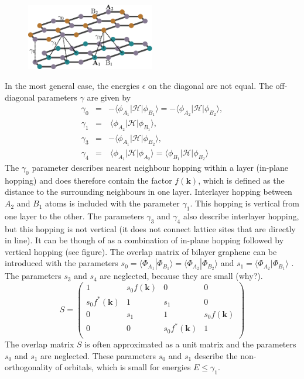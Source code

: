 \begin{figure}
\centering
\includegraphics[width=0.5\textwidth]{figure/numericalframework/graphene_lattice_bi_layer_planes_csch}
\end{figure}
In the most general case, the energies $\epsilon$ on the diagonal are not equal. The off-diagonal parameters $\gamma$ are given by
\begin{eqnarray}
\gamma_0 &=& - \langle \phi_{A_1} | \mathcal{H} | \phi_{B_1} \rangle = - \langle \phi_{A_2} | \mathcal{H} | \phi_{B_2} \rangle, \\
\gamma_1 &=& ~\langle \phi_{A_2} | \mathcal{H} | \phi_{B_1} \rangle, \\
\gamma_3 &=& - \langle \phi_{A_1} | \mathcal{H} | \phi_{B_2} \rangle, \\
\gamma_4 &=& ~\langle \phi_{A_1} | \mathcal{H} | \phi_{A_2} \rangle = \langle \phi_{B_1} | \mathcal{H} | \phi_{B_2} \rangle
\end{eqnarray}
The $\gamma_0$ parameter describes nearest neighbour hopping within a layer (in-plane hopping) and does therefore contain the factor $f\left( \mathbf{k} \right)$, which is defined as the distance to the surrounding neighbours in one layer. %
Interlayer hopping between $A_2$ and $B_1$ atoms is included with the parameter $\gamma_1$. This hopping is vertical from one layer to the other. The parameters $\gamma_3$ and $\gamma_4$ also describe interlayer hopping, but this hopping is not vertical (it does not connect lattice sites that are directly in line). It can be though of as a combination of in-plane hopping followed by vertical hopping (see figure).
The overlap matrix of bilayer graphene can be introduced with the parameters $s_0 = \langle \Phi_{A_1} | \Phi_{B_1} \rangle = \langle \Phi_{A_2} | \Phi_{B_2} \rangle $ and $s_1 = \langle \Phi_{A_2}  | \Phi_{B_1} \rangle $ \cite{Mucha-Kruczynski2010}. The parameters $s_3$ and $s_4$ are neglected, because they are small (why?).
\begin{equation}
S = \begin{pmatrix}
1 & s_0 f\left( \mathbf{k} \right)& 0 & 0 \\
s_0 f^*\left( \mathbf{k} \right) & 1 & s_1 & 0 \\
0 & s_1 & 1 & s_0 f\left( \mathbf{k} \right) \\
0 & 0 & s_0 f^* \left( \mathbf{k} \right) & 1\\
\end{pmatrix}
\end{equation}
The overlap matrix $S$ is often approximated as a unit matrix and the parameters $s_0$ and $s_1$ are neglected. These parameters $s_0$ and $s_1$ describe the non-orthogonality of orbitals, which is small for energies $E \leq \gamma_1$.

